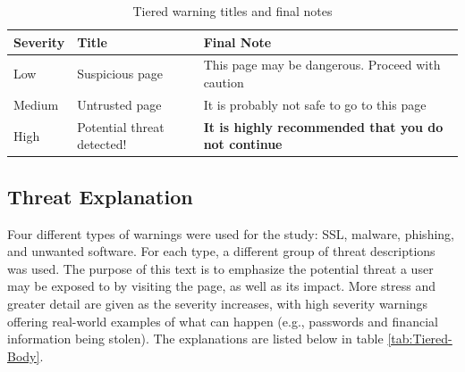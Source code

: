 {\renewcommand{\arraystretch}{1.2}
\begin{table}[!htb]
	\small
	\centering
	\begin{tabularx}{0.85\textwidth}{|l|X|X|}
		\hline
		\textbf{Severity} & \textbf{Title} & \textbf{Final Note}\\
		\hline
		Low 	& Suspicious page 				& This page may be dangerous. Proceed with caution\\
		\hline
		Medium 	& Untrusted page 				& It is probably not safe to go to this page\\
		\hline
		High 	& Potential threat detected! 	& \textbf{It is highly recommended that you do not continue}\\
		\hline
	\end{tabularx}
	\caption{Tiered warning titles and final notes}
	\label{tab:Tiered-Text}
\end{table}}

\subsection{Threat Explanation}
Four different types of warnings were used for the study: SSL, malware, phishing, and unwanted software. For each type, a different group of threat descriptions was used. The purpose of this text is to emphasize the potential threat a user may be exposed to by visiting the page, as well as its impact. More stress and greater detail are given as the severity increases, with high severity warnings offering real-world examples of what can happen (e.g., passwords and financial information being stolen). The explanations are listed below in table \ref{tab:Tiered-Body}.

